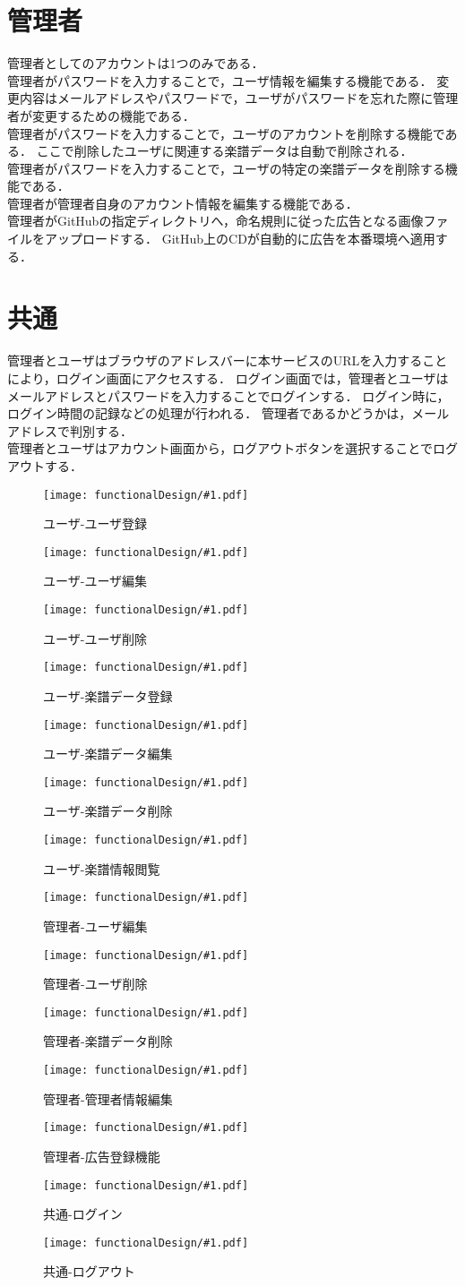 \section{管理者}
管理者としてのアカウントは1つのみである．\\
管理者がパスワードを入力することで，ユーザ情報を編集する機能である．
変更内容はメールアドレスやパスワードで，ユーザがパスワードを忘れた際に管理者が変更するための機能である．\\
管理者がパスワードを入力することで，ユーザのアカウントを削除する機能である．
ここで削除したユーザに関連する楽譜データは自動で削除される．\\
管理者がパスワードを入力することで，ユーザの特定の楽譜データを削除する機能である．\\
管理者が管理者自身のアカウント情報を編集する機能である．\\
管理者がGitHubの指定ディレクトリへ，命名規則に従った広告となる画像ファイルをアップロードする．
GitHub上のCDが自動的に広告を本番環境へ適用する．
\section{共通}
管理者とユーザはブラウザのアドレスバーに本サービスのURLを入力することにより，ログイン画面にアクセスする．
ログイン画面では，管理者とユーザはメールアドレスとパスワードを入力することでログインする．
ログイン時に，ログイン時間の記録などの処理が行われる．
管理者であるかどうかは，メールアドレスで判別する．\\
管理者とユーザはアカウント画面から，ログアウトボタンを選択することでログアウトする．
\newcommand{\icd}[2]{\begin{figure}[p]\centering\texttt{[image: functionalDesign/\#1.pdf]}\caption{#2}\label{#2}\end{figure}}
\icd{211-機能設計-利用者側-ユーザ登録}{ユーザ-ユーザ登録}
\icd{212-機能設計-利用者側-ユーザ編集}{ユーザ-ユーザ編集}
\icd{213-機能設計-利用者側-ユーザ削除}{ユーザ-ユーザ削除}
\icd{214-機能設計-利用者側-楽譜データ登録}{ユーザ-楽譜データ登録}
\icd{215-機能設計-利用者側-楽譜データ編集}{ユーザ-楽譜データ編集}
\icd{216-機能設計-利用者側-楽譜データ削除}{ユーザ-楽譜データ削除}
\icd{217-機能設計-利用者側-楽譜情報閲覧}{ユーザ-楽譜情報閲覧}
\icd{221-機能設計-管理者側-ユーザ編集}{管理者-ユーザ編集}
\icd{222-機能設計-管理者側-ユーザ削除}{管理者-ユーザ削除}
\icd{223-機能設計-管理者側-楽譜データ削除}{管理者-楽譜データ削除}
\icd{224-機能情報-管理者側-管理者情報編集機能}{管理者-管理者情報編集}
\icd{225-機能設計-管理者側-広告登録機能}{管理者-広告登録機能}
\icd{231-機能設計-利用者側-ログイン}{共通-ログイン}
\icd{232-機能設計-利用者側-ログアウト}{共通-ログアウト}
